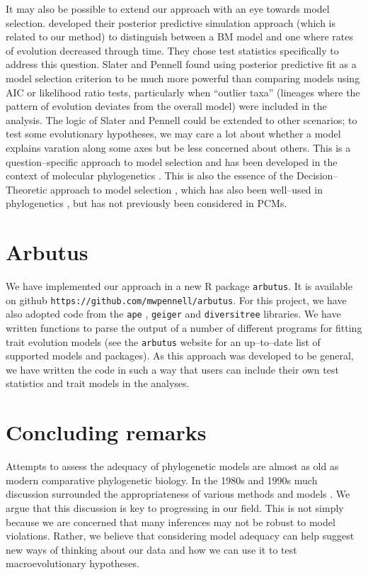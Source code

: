 \documentclass[a4paper,11pt]{article}
\begin{document}
{It may also be possible to extend our approach with an eye towards model selection. \citet{SlaterPennell} developed their posterior predictive simulation approach (which is related to our method) to distinguish between a BM model and one where rates of evolution decreased through time. They chose test statistics specifically to address this question. Slater and Pennell found using posterior predictive fit as a model selection criterion to be much more powerful than comparing models using AIC or likelihood ratio tests, particularly when ``outlier taxa'' (lineages where the pattern of evolution deviates from the overall model) were included in the analysis. The logic of Slater and Pennell could be extended to other scenarios; to test some evolutionary hypotheses, we may care a lot about whether a model explains varation along some axes but be less concerned about others. This is a question--specific approach to model selection and has been developed in the context of molecular phylogenetics \citep{Bollback2002, Lewis2013}. This is also the essence of the Decision--Theoretic approach to model selection \citep{Robert2007}, which has also been well--used in phylogenetics \citep{Minin2003}, but has not previously been considered in PCMs.


\section{Arbutus}

We have implemented our approach in a new R package \texttt{arbutus}. It is available on github \texttt{https://github.com/mwpennell/arbutus}. For this project, we have also adopted code from the \texttt{ape} \citep{ape}, \texttt{geiger} \citep{geiger2} and \texttt{diversitree} \citep{FitzJohn2012} libraries. We have written functions to parse the output of a number of different programs for fitting trait evolution models (see the \texttt{arbutus} website for an up--to--date list of supported models and packages). As this approach was developed to be general, we have written the code in such a way that users can include their own test statistics and trait models in the analyses.

\section{Concluding remarks}
Attempts to assess the adequacy of phylogenetic models are almost as old as modern comparative phylogenetic biology. In the 1980s and 1990s much discussion surrounded the appropriateness of various methods and models \citep{Felsenstein1985, Felsenstein1988, HarveyPagel1991, Garland1992, Diaz1996, Price1997, Garland1999, GarlandIves2000}. We argue that this discussion is key to progressing in our field. This is not simply because we are concerned that many inferences may not be robust to model violations. Rather, we believe that considering model adequacy can help suggest new ways of thinking about our data and how we can use it to test macroevolutionary hypotheses.

}
\end{document}
